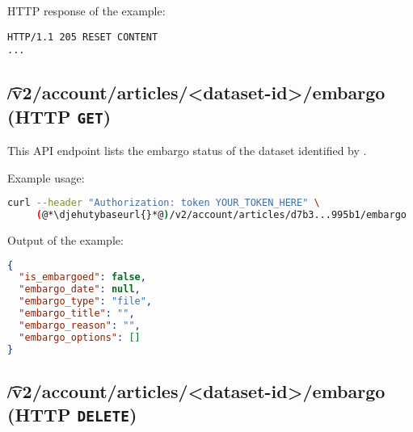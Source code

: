   HTTP response of the example:
\begin{lstlisting}
HTTP/1.1 205 RESET CONTENT
...
\end{lstlisting}





\subsection{\t{/v2/account/articles/<dataset-id>/embargo} (HTTP \texttt{GET})}

  This API endpoint lists the embargo status of the dataset identified by .

  Example usage:
\begin{lstlisting}[language=bash]
curl --header "Authorization: token YOUR_TOKEN_HERE" \
     (@*\djehutybaseurl{}*@)/v2/account/articles/d7b3...995b1/embargo | jq
\end{lstlisting}

  Output of the example:
\begin{lstlisting}[language=JSON]
{
  "is_embargoed": false,
  "embargo_date": null,
  "embargo_type": "file",
  "embargo_title": "",
  "embargo_reason": "",
  "embargo_options": []
}
\end{lstlisting}

\subsection{\t{/v2/account/articles/<dataset-id>/embargo} (HTTP \texttt{DELETE})}

